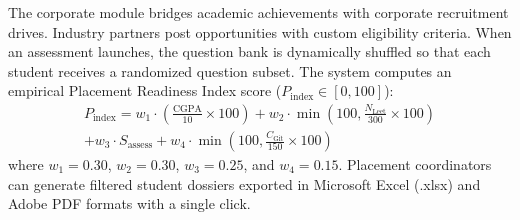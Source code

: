 {The corporate module bridges academic achievements with corporate recruitment drives. Industry partners post opportunities with custom eligibility criteria. When an assessment launches, the question bank is dynamically shuffled so that each student receives a randomized question subset.
The system computes an empirical Placement Readiness Index score ($P_{\text{index}} \in [0, 100]$):
\begin{multline}
P_{\text{index}} = w_1 \cdot \left(\frac{\text{CGPA}}{10} \times 100\right) + w_2 \cdot \min\left(100, \frac{N_{\text{Leet}}}{300} \times 100\right) \\
+ w_3 \cdot S_{\text{assess}} + w_4 \cdot \min\left(100, \frac{C_{\text{Git}}}{150} \times 100\right) \tag{12}
\end{multline}
where $w_1 = 0.30$, $w_2 = 0.30$, $w_3 = 0.25$, and $w_4 = 0.15$. Placement coordinators can generate filtered student dossiers exported in Microsoft Excel (.xlsx) and Adobe PDF formats with a single click.\par}
\newpage
